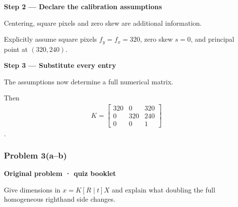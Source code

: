 \documentclass[letterpaper,11pt,english,openany,oneside]{jupyterBook}
\begin{document}
\par

\par\medskip{}
{\color{QuizStepRed}\bfseries Step 2 — Declare the calibration assumptions}\par\smallskip

\sphinxAtStartPar
{} Centering, square pixels and zero skew are additional information.

\sphinxAtStartPar
Explicitly assume square pixels {\color{QuizMathBlue} \(f_y=f_x=320\)}, zero skew {\color{QuizMathBlue} \(s=0\)}, and principal point at {\color{QuizMathBlue} \((320,240)\)}.

\par

\par\medskip{}
{\color{QuizStepRed}\bfseries Step 3 — Substitute every entry}\par\smallskip

\sphinxAtStartPar
{} The assumptions now determine a full numerical matrix.

\sphinxAtStartPar
Then
{\color{QuizMathBlue} \begin{equation*}
\begin{split}
\boxed{K=\begin{bmatrix}320&0&320\\0&320&240\\0&0&1\end{bmatrix}}
\end{split}
\end{equation*}}
\sphinxAtStartPar
.

\par


\subsubsection{Problem 3(a–b)}
\label{\detokenize{lectures/lecture03/quiz-workbook:quiz-11-q3}}\label{\detokenize{lectures/lecture03/quiz-workbook:id3}}
\par\medskip\textbf{Original problem · quiz booklet}\par\smallskip

\sphinxAtStartPar
Give dimensions in \(x=K[R\mid t]X\) and explain what doubling the full homogeneous right\sphinxhyphen{}hand side changes.

\par\medskip
\end{document}
